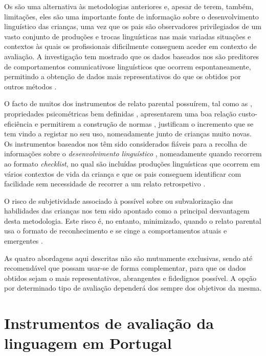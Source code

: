 \documentclass[output=paper]{LSP/langsci}
\begin{document}
Os  são uma alternativa às metodologias anteriores e, apesar de terem, também, limitações, eles são uma importante fonte de informação sobre o desenvolvimento linguístico das crianças, uma vez que os pais são observadores privilegiados de um vasto conjunto de produções e trocas linguísticas nas mais variadas situações e contextos às quais os profissionais dificilmente conseguem aceder em contexto de avaliação. A investigação tem mostrado que os dados baseados nos  são preditores de comportamentos comunicativos\newpage e linguísticos que ocorrem espontaneamente, permitindo a obtenção de dados mais representativos do que os obtidos por outros métodos \citep{fenson_etal2007}. 

O facto de muitos dos instrumentos de relato parental possuírem, tal como as , propriedades psicométricas bem definidas \citep{paul2007}, apresentarem uma boa relação custo-eficiência e permitirem a construção de normas \citep{fenson_etal2007,simonsen2014norwegian}, justificam o incremento que se tem vindo a registar no seu uso, nomeadamente junto de crianças muito novas. Os instrumentos baseados nos  têm sido considerados fiáveis para a recolha de informações sobre o \textit{desenvolvimento linguístico} \citep{feldman_etal2000,fenson_etal2007,jacksonmaldonado1993,thal2000}, nomeadamente quando recorrem ao formato \textit{checklist}, no qual são incluídas produções linguísticas que ocorrem em vários contextos de vida da criança e que os pais conseguem identificar com facilidade sem necessidade de recorrer a um relato retrospetivo \citep{bates1993}. 

O risco de subjetividade associado à possível sobre ou subvalorização das habilidades das crianças nos  tem sido apontado como a principal desvantagem desta metodologia. Este risco é, no entanto, minimizado, quando o relato parental usa o formato de reconhecimento e se cinge a comportamentos atuais e emergentes \citep{fenson_etal2007}.

As quatro abordagens aqui descritas não são mutuamente exclusivas, sendo até recomendável que possam usar-se de forma complementar, para que os dados obtidos sejam o mais representativos, abrangentes e fidedignos possível. A opção por determinado tipo de avaliação dependerá dos sempre dos objetivos da mesma. 

\section{Instrumentos de avaliação da linguagem em Portugal}
\label{sec:viana_instrumentos_portugal}
\end{document}
